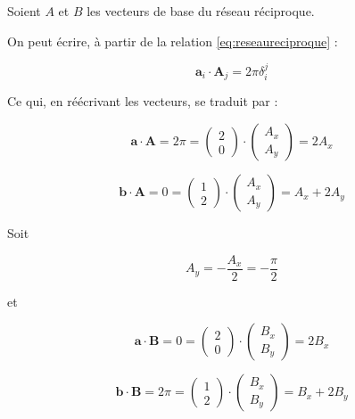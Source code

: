 Soient $A$ et $B$ les vecteurs de base du réseau réciproque.

On peut écrire, à partir de la relation \ref{eq:reseaureciproque} :

\begin{equation}
\mathbf{a}_i \cdot \mathbf{A}_j = 2\pi \delta_i^j
\end{equation}

Ce qui, en réécrivant les vecteurs, se traduit par :

\begin{equation*}
\mathbf{a} \cdot \mathbf{A} = 2\pi = \begin{pmatrix} 2 \\0 \end{pmatrix}\cdot\begin{pmatrix} A_x \\ A_y \end{pmatrix} = 2A_x
\end{equation*}

\begin{equation*}
\mathbf{b} \cdot \mathbf{A} = 0 = \begin{pmatrix} 1 \\2 \end{pmatrix}\cdot\begin{pmatrix} A_x \\ A_y \end{pmatrix} = A_x + 2A_y
\end{equation*}

Soit

\begin{equation*}
A_y = -\frac{A_x}{2} = -\frac{\pi}{2}
\end{equation*}

et

\begin{equation*}
\mathbf{a} \cdot \mathbf{B} = 0 = \begin{pmatrix} 2 \\0 \end{pmatrix}\cdot\begin{pmatrix} B_x \\ B_y \end{pmatrix} = 2B_x
\end{equation*}

\begin{equation*}
\mathbf{b} \cdot \mathbf{B} = 2\pi = \begin{pmatrix} 1 \\2 \end{pmatrix}\cdot\begin{pmatrix} B_x \\ B_y \end{pmatrix} = B_x + 2B_y
\end{equation*}


